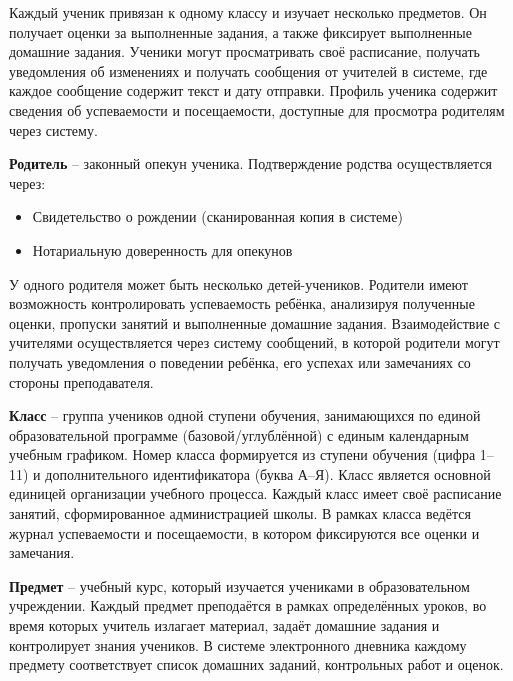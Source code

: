 \documentclass[a4paper, final]{article}
\begin{document}
Каждый ученик привязан к одному классу и изучает несколько предметов. Он получает оценки за выполненные задания, а также фиксирует выполненные домашние задания. Ученики могут просматривать своё расписание, получать уведомления об изменениях и получать сообщения от учителей в системе, где каждое сообщение содержит текст и дату отправки. Профиль ученика содержит сведения об успеваемости и посещаемости, доступные для просмотра родителям через систему.

\textbf{Родитель} -- законный опекун ученика. Подтверждение родства осуществляется через:
\begin{itemize}
  \item Свидетельство о рождении (сканированная копия в системе)
  \item Нотариальную доверенность для опекунов
\end{itemize}

У одного родителя может быть несколько детей-учеников. Родители имеют возможность контролировать успеваемость ребёнка, анализируя полученные оценки, пропуски занятий и выполненные домашние задания. Взаимодействие с учителями осуществляется через систему сообщений, в которой родители могут получать уведомления о поведении ребёнка, его успехах или замечаниях со стороны преподавателя.

\textbf{Класс} -- группа учеников одной ступени обучения, занимающихся по единой образовательной программе (базовой/углублённой) с единым календарным учебным графиком. Номер класса формируется из ступени обучения (цифра 1--11) и дополнительного идентификатора (буква А--Я). Класс является основной единицей организации учебного процесса. Каждый класс имеет своё расписание занятий, сформированное администрацией школы. В рамках класса ведётся журнал успеваемости и посещаемости, в котором фиксируются все оценки и замечания.

\textbf{Предмет} -- учебный курс, который изучается учениками в образовательном учреждении. Каждый предмет преподаётся в рамках определённых уроков, во время которых учитель излагает материал, задаёт домашние задания и контролирует знания учеников. В системе электронного дневника каждому предмету соответствует список домашних заданий, контрольных работ и оценок.
\end{document}
